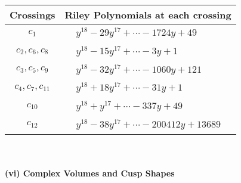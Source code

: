 \documentclass[1p]{elsarticle_modified}
\theoremstyle{definition}
\begin{document}
\begin{tabular}{m{50pt}|m{274pt}}
Crossings & \hspace{64pt}Riley Polynomials at each crossing \\
\hline $$\begin{aligned}c_{1}\end{aligned}$$&$\begin{aligned}
&y^{18}-29 y^{17}+\cdots-1724 y+49
\end{aligned}$\\
\hline $$\begin{aligned}c_{2},c_{6},c_{8}\end{aligned}$$&$\begin{aligned}
&y^{18}-15 y^{17}+\cdots-3 y+1
\end{aligned}$\\
\hline $$\begin{aligned}c_{3},c_{5},c_{9}\end{aligned}$$&$\begin{aligned}
&y^{18}-32 y^{17}+\cdots-1060 y+121
\end{aligned}$\\
\hline $$\begin{aligned}c_{4},c_{7},c_{11}\end{aligned}$$&$\begin{aligned}
&y^{18}+18 y^{17}+\cdots-31 y+1
\end{aligned}$\\
\hline $$\begin{aligned}c_{10}\end{aligned}$$&$\begin{aligned}
&y^{18}+y^{17}+\cdots-337 y+49
\end{aligned}$\\
\hline $$\begin{aligned}c_{12}\end{aligned}$$&$\begin{aligned}
&y^{18}-38 y^{17}+\cdots-200412 y+13689
\end{aligned}$\\
\hline
\end{tabular}\\~\\
\newpage\flushleft \textbf{(vi) Complex Volumes and Cusp Shapes}
\end{document}
